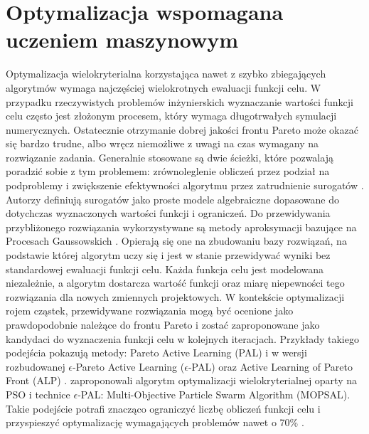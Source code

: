 \section{Optymalizacja wspomagana uczeniem maszynowym}
Optymalizacja wielokryterialna korzystająca nawet z szybko zbiegających algorytmów wymaga najczęściej wielokrotnych ewaluacji funkcji celu. W przypadku rzeczywistych problemów inżynierskich wyznaczanie wartości funkcji celu często jest złożonym procesem, który wymaga długotrwałych symulacji numerycznych. Ostatecznie otrzymanie dobrej jakości frontu Pareto może okazać się bardzo trudne, albo wręcz niemożliwe z uwagi na czas wymagany na rozwiązanie zadania. Generalnie stosowane są dwie ścieżki, które pozwalają poradzić sobie z tym problemem: zrównoleglenie obliczeń przez podział na podproblemy i zwiększenie efektywności algorytmu przez zatrudnienie surogatów  \parencite{Haftka2016}. Autorzy definiują surogatów jako proste modele algebraiczne dopasowane do dotychczas wyznaczonych wartości funkcji i ograniczeń. Do przewidywania przybliżonego rozwiązania wykorzystywane są metody aproksymacji bazujące na Procesach Gaussowskich  \parencite{Rasmussen2006,Rasmussen2010}. Opierają się one na zbudowaniu bazy rozwiązań, na podstawie której algorytm uczy się i jest w stanie przewidywać wyniki bez standardowej ewaluacji funkcji celu. Każda funkcja celu jest modelowana niezależnie, a algorytm dostarcza wartość funkcji oraz miarę niepewności tego rozwiązania dla nowych zmiennych projektowych. 
W kontekście optymalizacji rojem cząstek, przewidywane rozwiązania mogą być ocenione jako prawdopodobnie należące do frontu Pareto i zostać zaproponowane jako kandydaci do wyznaczenia funkcji celu w kolejnych iteracjach. Przykłady takiego podejścia pokazują metody: Pareto Active Learning (PAL) \parencite{Zuluaga2013} i w wersji rozbudowanej $\epsilon$-Pareto Active Learning ($\epsilon$-PAL) \parencite{Zuluaga2016} oraz Active Learning of Pareto Front (ALP) \parencite{Campigotto2013}.     \cite{Lv2017,Lv2019} zaproponowali algorytm optymalizacji wielokryterialnej oparty na PSO i technice $\epsilon$-PAL: Multi-Objective Particle Swarm Algorithm (MOPSAL). Takie podejście potrafi znacząco ograniczyć liczbę obliczeń funkcji celu i przyspieszyć optymalizację wymagających problemów nawet o 70\% \parencite{Zuluaga2016}.



